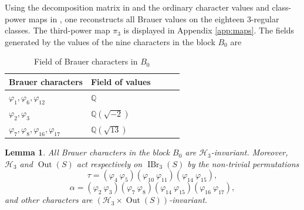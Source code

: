 \documentclass[11pt,a4paper]{article}
\numberwithin{equation}{section}
\newtheorem{lemma}[theorem]{Lemma}
\theoremstyle{definition}
\theoremstyle{remark}
\newcommand{\IBr}{\operatorname{IBr}}
\newcommand{\Out}{\operatorname{Out}}
\newcommand{\HH}{\mathcal H}
\newcommand{\QQ}{\mathbb Q}
\begin{document}
Using the decomposition matrix in \cite{R} and the ordinary character values and class-power maps in \cite{T,OrdData}, one reconstructs all Brauer values on the eighteen \(3\)-regular classes. The third-power map $\pi_3$ is displayed in Appendix \ref{app:maps}. The fields generated by the values of the nine characters in the block $B_0$ are
\begin{table}[ht]
\centering
\caption{Field of Brauer characters in $B_0$}
\label{p3:tab:weights}
\begin{tabular}{@{}lllrr@{}}
\toprule
Brauer characters&Field of values\\
\midrule
\(\varphi_1,\varphi_6,\varphi_{12}\)&\(\QQ\)\\
\(\varphi_2,\varphi_3\)&\(\QQ(\sqrt{-2})\)\\
\(\varphi_7,\varphi_8,\varphi_{16},\varphi_{17}\)&\(\QQ(\sqrt{13})\)\\
\bottomrule
\end{tabular}
\end{table}
\begin{lemma}\label{equ}
All Brauer characters in the block $B_0$ are \(\mathcal H_3\)-invariant. Moreover, $\HH_3$ and $\Out(S)$ act respectively on $\IBr_3(S)$ by the non-trivial permutations
\[
\tau=(\varphi_4\ \varphi_5)(\varphi_{10}\ \varphi_{11})
 (\varphi_{14}\ \varphi_{15}),
\]
\[
\alpha=(\varphi_2\ \varphi_3)
 (\varphi_7\ \varphi_8)
 (\varphi_{14}\ \varphi_{15})
 (\varphi_{16}\ \varphi_{17}),
\]
and other characters are $(\HH_3\times \Out(S))$-invariant.
\end{lemma}
\end{document}
